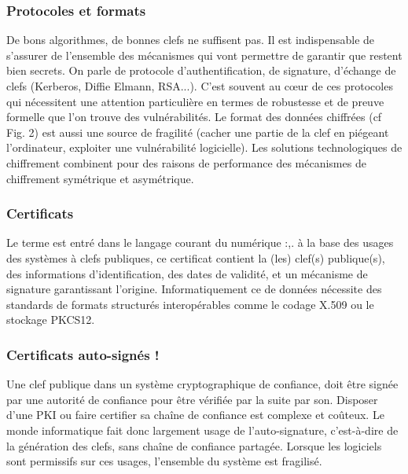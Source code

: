 \subsubsection{Protocoles et formats}
De bons algorithmes, de bonnes clefs ne suffisent pas. Il est indispensable de s'assurer de l'ensemble des mécanismes qui vont permettre de garantir que restent bien secrets. On parle de protocole d'authentification, de signature, d'échange de clefs (Kerberos, Diffie
Elmann, RSA...). C'est souvent au cœur de ces protocoles qui nécessitent une attention particulière en termes de robustesse et de preuve formelle que l'on trouve des vulnérabilités. Le format des données chiffrées (cf Fig. 2) est aussi une source de fragilité (cacher une partie de la clef en piégeant l'ordinateur, exploiter une vulnérabilité logicielle). Les solutions technologiques de chiffrement combinent pour des raisons de performance des mécanismes de chiffrement symétrique et asymétrique.
\subsubsection{Certificats}
Le terme est entré dans le langage courant du numérique :,. à la base des usages des systèmes à clefs publiques, ce certificat contient la (les) clef(s) publique(s), des informations d'identification, des dates de validité, et un mécanisme de signature garantissant l'origine. Informatiquement ce de données nécessite des standards de formats structurés interopérables comme le codage X.509 ou le stockage PKCS12.






\subsubsection{Certificats auto-signés !}
Une clef publique dans un système cryptographique de confiance, doit être signée par une autorité de confiance pour être vérifiée par la suite par son. Disposer d'une PKI ou faire certifier sa chaîne de confiance est complexe et coûteux. Le monde informatique fait donc largement usage de l'auto-signature, c'est-à-dire de la génération des clefs, sans chaîne de confiance partagée. Lorsque les logiciels sont permissifs sur ces usages, l'ensemble du système est fragilisé.

